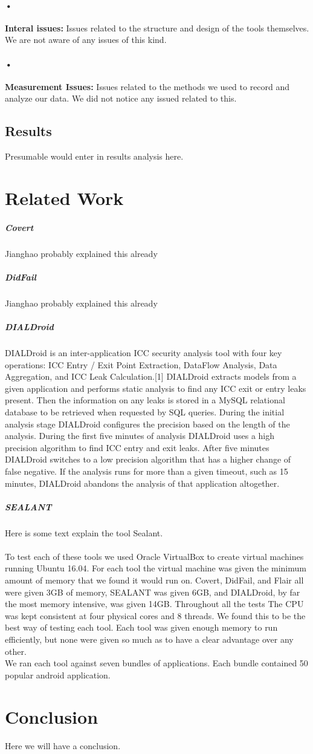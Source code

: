 \documentclass[twocolumn]{article}
\begin{document}
\paragraph{•}
	\textbf{Interal issues:} Issues related to the structure and design of the tools themselves. We are not aware of any issues of this kind.
\paragraph{•}
	\textbf{Measurement Issues:} Issues related to the methods we used to record and analyze our data. We did not notice any issued related to this.
	

\subsection{Results}
Presumable would enter in results analysis here.

\section[2]{Related Work}
	
	\subparagraph{Covert}
		Jianghao probably explained this already
	\subparagraph{DidFail}
		Jianghao probably explained this already

	
	\subparagraph{DIALDroid}
		DIALDroid is an inter-application ICC security analysis tool with four key operations: ICC Entry / Exit Point Extraction, DataFlow Analysis, Data Aggregation, and ICC Leak Calculation.[1] DIALDroid extracts models from a given application and performs static analysis to find any ICC exit or entry leaks present. Then the information on any leaks is stored in a MySQL relational database to be retrieved when requested by SQL queries. During the initial analysis stage DIALDroid configures the precision based on the length of the analysis. During the first five minutes of analysis DIALDroid uses a high precision algorithm to find ICC entry and exit leaks. After five minutes DIALDroid switches to a low precision algorithm that has a higher change of false negative. If the analysis runs for more than a given timeout, such as 15 minutes, DIALDroid abandons the analysis of that application altogether.
	\subparagraph{SEALANT}
		Here is some text explain the tool Sealant.
\paragraph*{}
	To test each of these tools we used Oracle VirtualBox to create virtual machines running Ubuntu 16.04. For each tool the virtual machine was given the minimum amount of memory that we found it would run on. Covert, DidFail, and Flair all were given 3GB of memory, SEALANT was given 6GB, and DIALDroid, by far the most memory intensive, was given 14GB. Throughout all the tests The CPU was kept consistent at four physical cores and 8 threads. We found this to be the best way of testing each tool. Each tool was given enough memory to run efficiently, but none were given so much as to have a clear advantage over any other.\\ 
	We ran each tool against seven bundles of applications. Each bundle contained 50 popular android application.


\section[3]{Conclusion}
Here we will have a conclusion.
\end{document}
